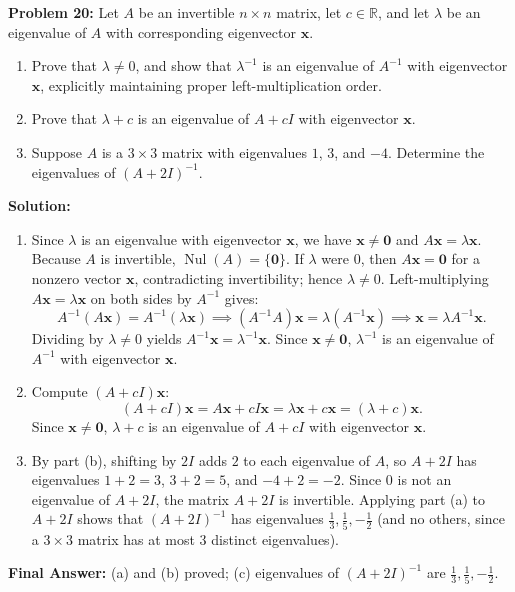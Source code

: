 \documentclass[11pt, letterpaper]{article}
\theoremstyle{definition}
\theoremstyle{remark}
\begin{document}
\vspace{0.4em}
\textbf{Problem 20:}
Let $A$ be an invertible $n \times n$ matrix, let $c \in \mathbb{R}$, and let $\lambda$ be an eigenvalue of $A$ with corresponding eigenvector $\mathbf{x}$.
\begin{enumerate}[label=(\alph*)]
    \item Prove that $\lambda \neq 0$, and show that $\lambda^{-1}$ is an eigenvalue of $A^{-1}$ with eigenvector $\mathbf{x}$, explicitly maintaining proper left-multiplication order.
    \item Prove that $\lambda + c$ is an eigenvalue of $A + cI$ with eigenvector $\mathbf{x}$.
    \item Suppose $A$ is a $3 \times 3$ matrix with eigenvalues $1$, $3$, and $-4$. Determine the eigenvalues of $(A + 2I)^{-1}$.
\end{enumerate}

\textbf{Solution:}
\begin{enumerate}[label=(\alph*)]
    \item Since $\lambda$ is an eigenvalue with eigenvector $\mathbf{x}$, we have $\mathbf{x} \neq \mathbf{0}$ and $A\mathbf{x} = \lambda\mathbf{x}$. Because $A$ is invertible, $\operatorname{Nul}(A) = \{\mathbf{0}\}$. If $\lambda$ were $0$, then $A\mathbf{x} = \mathbf{0}$ for a nonzero vector $\mathbf{x}$, contradicting invertibility; hence $\lambda \neq 0$. Left-multiplying $A\mathbf{x} = \lambda\mathbf{x}$ on both sides by $A^{-1}$ gives:
    \[
    A^{-1}(A\mathbf{x}) = A^{-1}(\lambda\mathbf{x}) \implies (A^{-1}A)\mathbf{x} = \lambda(A^{-1}\mathbf{x}) \implies \mathbf{x} = \lambda A^{-1}\mathbf{x}.
    \]
    Dividing by $\lambda \neq 0$ yields $A^{-1}\mathbf{x} = \lambda^{-1}\mathbf{x}$. Since $\mathbf{x} \neq \mathbf{0}$, $\lambda^{-1}$ is an eigenvalue of $A^{-1}$ with eigenvector $\mathbf{x}$.

    \item Compute $(A + cI)\mathbf{x}$:
    \[
    (A + cI)\mathbf{x} = A\mathbf{x} + cI\mathbf{x} = \lambda\mathbf{x} + c\mathbf{x} = (\lambda + c)\mathbf{x}.
    \]
    Since $\mathbf{x} \neq \mathbf{0}$, $\lambda + c$ is an eigenvalue of $A + cI$ with eigenvector $\mathbf{x}$.

    \item By part (b), shifting by $2I$ adds $2$ to each eigenvalue of $A$, so $A + 2I$ has eigenvalues $1+2 = 3$, $3+2 = 5$, and $-4+2 = -2$. Since $0$ is not an eigenvalue of $A + 2I$, the matrix $A + 2I$ is invertible. Applying part (a) to $A + 2I$ shows that $(A + 2I)^{-1}$ has eigenvalues $\frac{1}{3}, \frac{1}{5}, -\frac{1}{2}$ (and no others, since a $3 \times 3$ matrix has at most $3$ distinct eigenvalues).
\end{enumerate}
\textbf{Final Answer:} (a) and (b) proved; (c) eigenvalues of $(A+2I)^{-1}$ are $\frac{1}{3}, \frac{1}{5}, -\frac{1}{2}$.
\end{document}
